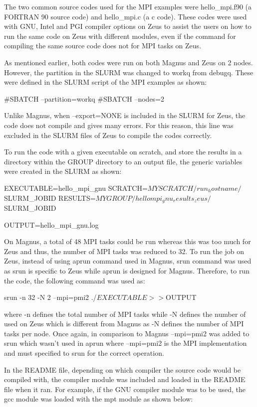\documentclass[journal]{IEEEtran}
\begin{document}
The two common source codes used for the MPI examples were hello_mpi.f90 (a FORTRAN 90 source code) and hello_mpi.c (a c code). These codes were used 
with GNU, Intel and PGI compiler options on Zeus to assist the users on how to run the same code on Zeus with different modules, even if the command 
for compiling the same source code does not for MPI tasks on Zeus.

As mentioned earlier, both codes were run on both Magnus and Zeus on 2 nodes. However, the partition in the SLURM was changed to workq from debugq.
These were defined in the SLURM script of the MPI examples as shown: 

#SBATCH --partition=workq
#SBATCH --nodes=2

Unlike Magnus, when --export=NONE is included in the SLURM for Zeus, the code does not compile and gives many errors. For this reason, this line was
excluded in the SLURM files of Zeus to compile the codes correctly.

To run the code with a given executable on scratch, and store the results in a directory within the GROUP directory to an output file, the generic 
variables were created in the SLURM as shown:

EXECUTABLE=hello_mpi_gnu
SCRATCH=$MYSCRATCH/run_hostname/$SLURM_JOBID
RESULTS=$MYGROUP/hellompi_gnu_results_zeus/$SLURM_JOBID

OUTPUT=hello_mpi_gnu.log

On Magnus, a total of 48 MPI tasks could be run whereas this was too much for Zeus and thus, the number of MPI tasks was reduced to 32. To run the job
on Zeus, instead of using aprun command used in Magnus, srun command was used as srun is specific to Zeus while aprun is designed for Magnus. Therefore,
to run the code, the following command was used as:

srun -n 32 -N 2 --mpi=pmi2 ./$EXECUTABLE >> ${OUTPUT}

where -n defines the total number of MPI tasks while -N defines the number of used on Zeus which is different from Magnus as -N defines the number of
MPI tasks per node. Once again, in comparison to Magnus --mpi=pmi2 was added to srun which wasn't used in aprun where --mpi=pmi2 is the MPI
implementation and must specified to srun for the correct operation.

In the README file, depending on which compiler the source code would be compiled with, the compiler module was included and loaded in the README file 
when it ran. For example, if the GNU compiler module was to be used, the gcc module was loaded with the mpt module as shown below:
\end{document}
